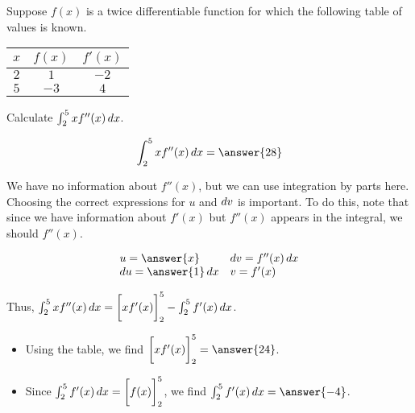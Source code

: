 \documentclass{ximera}
\author{Jim Talamo}
\begin{document}
\begin{exercise}
Suppose $f(x)$ is a twice differentiable function for which the following table of values is known.

\large
\begin{center}
\begin{tabular}{|c|c|c|}
\hline
$x$ & $f(x)$ & $f'(x)$ \\
\hline 
$2$ & $1$ & $-2$ \\
\hline
$5$ & $-3$ & $4$ \\
\hline
\end{tabular}

\end{center}
\normalsize


Calculate $\int_2^5 x f''(x) \mathop{}\!d x$.

\[
\int_2^5 x f''(x) \d x = \answer{28}
\]

\begin{hint}
We have no information about $f''(x)$, but we can use integration by parts here.  Choosing the correct expressions for $u$ and $\mathop{}\!d v$ is important.  To do this, note that since we have information about $f'(x)$ but $f''(x)$ appears in the integral, we should  $f''(x)$.

\begin{question}
\[\begin{array}{ll}
u = \answer{x}  & \d v = f''(x) \d x \\
\d u = \answer{1} \d x & v = f'(x)
\end{array}\]

Thus, $\int_2^5 x f''(x) \mathop{}\!d x = \bigg[ x f'(x) \bigg]_2^5-\int_2^5 f'(x) \mathop{}\!d x$. 

\begin{itemize}
\item Using the table, we find $ \eval{x f'(x)}_2^5 = \answer{24}$.
\item Since $\int_2^5 f'(x) \mathop{}\!d x = \bigg[ f(x) \bigg]_2^5$, we find $\int_2^5 f'(x) \d x = \answer{-4}$.
\end{itemize}

\end{question}
\end{hint}

\end{exercise}
\end{document}
